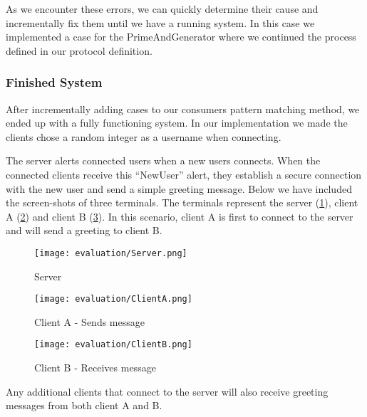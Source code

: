 As we encounter these errors, we can quickly determine their cause and incrementally fix them until we have a running system. In this case we implemented a case for the PrimeAndGenerator where we continued the process defined in our protocol definition.

\subsubsection{Finished System}
After incrementally adding cases to our consumers pattern matching method, we ended up with a fully functioning system. In our implementation we made the clients chose a random integer as a username when connecting. 

The server alerts connected users when a new users connects. When the connected clients receive this ``NewUser'' alert, they establish a secure connection with the new user and send a simple greeting message. Below we have included the screen-shots of three terminals. The terminals represent the server (\ref{fig:server}), client A (\ref{fig:clienta}) and client B (\ref{fig:clientb}). In this scenario, client A is first to connect to the server and will send a greeting to client B.

\begin{figure}[H]
  \centering
  \texttt{[image: evaluation/Server.png]}
  \caption{Server}
  \label{fig:server}
\end{figure}

\begin{figure}[H]
  \centering
  \texttt{[image: evaluation/ClientA.png]}
  \caption{Client A - Sends message}
  \label{fig:clienta}
\end{figure}

\begin{figure}[H]
  \centering
  \texttt{[image: evaluation/ClientB.png]}
  \caption{Client B - Receives message}
  \label{fig:clientb}
\end{figure}

Any additional clients that connect to the server will also receive greeting messages from both client A and B.





